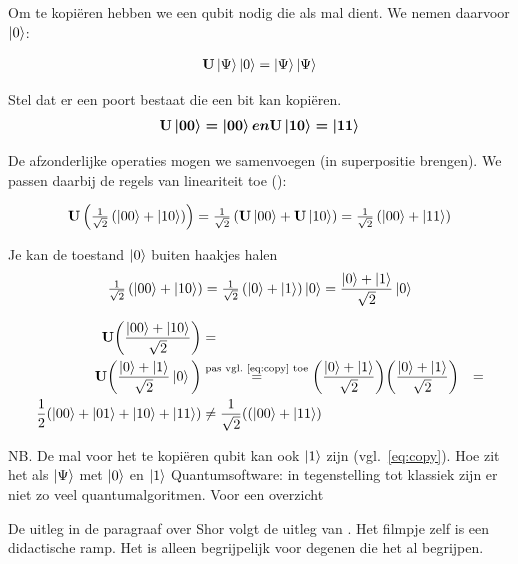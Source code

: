 \documentclass[../../main.tex]{subfiles}
\begin{document}
Om te kopi\"eren hebben we een qubit nodig die als mal dient. We nemen daarvoor  $\ket{0}$:

\begin{align}\label{eq:copy}
\port{U}\ket{\Psi}\ket{0}=\ket{\Psi}\ket{\Psi}
\end{align}

Stel dat er een poort bestaat die een bit kan kopi\"eren. 
\[ \port{U}\ket{00} = \ket{00} en \port{U}\ket{10}=\ket{11}\]

De afzonderlijke operaties mogen we samenvoegen (in superpositie brengen). We passen daarbij de regels van lineariteit toe ():

\[\begin{aligned}
\port{U}\left(\tfrac{1}{\sqrt{2}}\left(\ket{00}+\ket{10}\right)\right)=\tfrac{1}{\sqrt{2}}\left(\port{U}\ket{00}+\port{U}\ket{10}\right)=
\tfrac{1}{\sqrt{2}}\left(\ket{00}+\ket{11}\right)
\end{aligned}\]


Je kan de toestand $\ket{0}$ buiten haakjes halen
\[\begin{aligned}
\tfrac{1}{\sqrt{2}}\left(\ket{00}+\ket{10}\right)=
\tfrac{1}{\sqrt{2}}\left(\ket{0}+\ket{1}\right)\ket{0}=
\frac{\ket{0}+\ket{1}}{\sqrt{2}}\ket{0}
\end{aligned}\]


\[\begin{aligned}
\port{U}\bigg(\frac{\ket{00}+\ket{10}}{\sqrt{2}}\bigg)&=\nonumber\\
\port{U}\bigg(\frac{\ket{0}+\ket{1}}{\sqrt{2}}\ket{0}\bigg)&\stackrel{\text{pas vgl.~\ref{eq:copy} toe}}{=}\nonumber
\bigg(\frac{\ket{0}+\ket{1}}{\sqrt{2}}\bigg)\bigg(\frac{\ket{0}+\ket{1}}{\sqrt{2}}\bigg)&=\nonumber\\
\frac{1}{2}(\ket{00}+\ket{01}+\ket{10}+\ket{11})&\neq \nonumber
\frac{1}{\sqrt{2}}((\ket{00}+\ket{11})&\nonumber
\end{aligned}\]

NB. De mal voor het te kopi\"eren qubit kan ook $\ket{1}$ zijn (vgl.~\ref{eq:copy}).
Hoe zit het als $\ket{\Psi}$ met $\ket{0}$ en $\ket{1}$
\fi
\iffalse%
Quantumsoftware: in tegenstelling tot klassiek zijn er niet zo veel quantumalgoritmen. Voor een overzicht \cite{Jordan2021} 

De uitleg in de paragraaf over Shor volgt de uitleg van . Het filmpje zelf is een didactische ramp. Het is alleen begrijpelijk voor degenen die het al begrijpen. 
\end{document}
